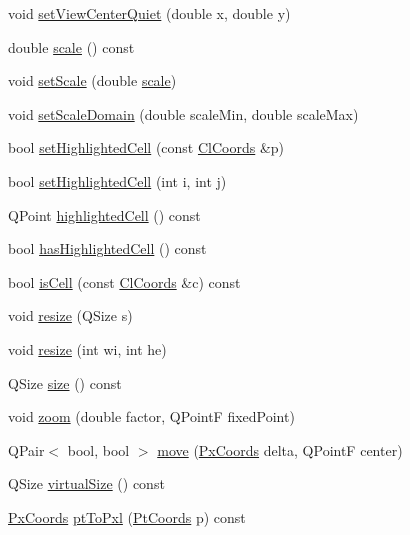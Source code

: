 \begin{DoxyCompactItemize}
\item 
void \hyperlink{class_map_painter_a5da86b2c104c9d22eb54ecd7b1d0b960}{set\+View\+Center\+Quiet} (double x, double y)
\item 
double \hyperlink{class_map_painter_af923e94f6a43d1341282d61aaf8603e7}{scale} () const
\item 
void \hyperlink{class_map_painter_ae1d7e11835d4ee6588c5b5f0429787e3}{set\+Scale} (double \hyperlink{class_map_painter_af923e94f6a43d1341282d61aaf8603e7}{scale})
\item 
void \hyperlink{class_map_painter_afaed21e6944cf1e62398f3f7a0067999}{set\+Scale\+Domain} (double scale\+Min, double scale\+Max)
\item 
bool \hyperlink{class_map_painter_ad7effe1c69fb1409d696dd54edd8bbb3}{set\+Highlighted\+Cell} (const \hyperlink{class_cl_coords}{Cl\+Coords} \&p)
\item 
bool \hyperlink{class_map_painter_a49c452342b60a341e7b3530141adeda8}{set\+Highlighted\+Cell} (int i, int j)
\item 
Q\+Point \hyperlink{class_map_painter_a61c6dc7ea2173b51e8164b55bf7c8f53}{highlighted\+Cell} () const
\item 
bool \hyperlink{class_map_painter_a8d2bdf48a8b1fc578a5b9436ad78307e}{has\+Highlighted\+Cell} () const
\item 
bool \hyperlink{class_map_painter_ad7582541fbc927d0d82169f9dcd22767}{is\+Cell} (const \hyperlink{class_cl_coords}{Cl\+Coords} \&c) const
\item 
void \hyperlink{class_map_painter_ae215f704c3f1ee11bb89861b9b4b13d3}{resize} (Q\+Size s)
\item 
void \hyperlink{class_map_painter_a3280e72c6ffed5e7c550d4632a6de794}{resize} (int wi, int he)
\item 
Q\+Size \hyperlink{class_map_painter_aeec29e22231c125bb8df15288082dd50}{size} () const
\item 
void \hyperlink{class_map_painter_a2dacde51513a54fbbf45b44787cd0ee2}{zoom} (double factor, Q\+PointF fixed\+Point)
\item 
Q\+Pair$<$ bool, bool $>$ \hyperlink{class_map_painter_a55dd52865ad3f50b91dadd1f1b6f9352}{move} (\hyperlink{class_px_coords}{Px\+Coords} delta, Q\+PointF center)
\item 
Q\+Size \hyperlink{class_map_painter_a49be79b1a7ac1edc703aa3fd954f80d6}{virtual\+Size} () const
\item 
\hyperlink{class_px_coords}{Px\+Coords} \hyperlink{class_map_painter_a197f9204a07c9265fd0469f71effcdb3}{pt\+To\+Pxl} (\hyperlink{class_pt_coords}{Pt\+Coords} p) const

\end{DoxyCompactItemize}
